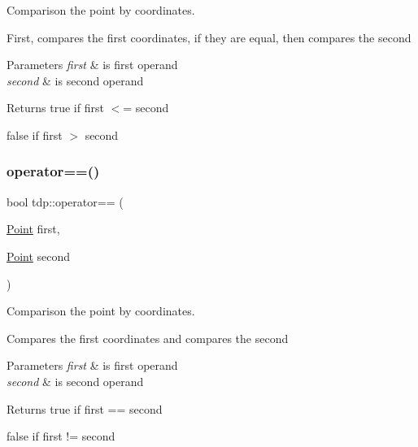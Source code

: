 Comparison the point by coordinates. 

First, compares the first coordinates, if they are equal, then compares the second 
\begin{DoxyParams}{Parameters}
{\em first} & is first operand \\
\hline
{\em second} & is second operand \\
\hline
\end{DoxyParams}
\begin{DoxyReturn}{Returns}
true if \textquotesingle{}first\textquotesingle{} $<$= \textquotesingle{}second\textquotesingle{} 

false if \textquotesingle{}first\textquotesingle{} $>$ \textquotesingle{}second\textquotesingle{} 
\end{DoxyReturn}
\mbox{\label{namespacetdp_ac28871640d9ee5c6f37f75be07b6d187}} 
\subsubsection{\texorpdfstring{operator==()}{operator==()}}
{\footnotesize\ttfamily bool tdp\+::operator== (\begin{DoxyParamCaption}\item[{\mbox{\hyperlink{structtdp_1_1_point}{Point}}}]{first,  }\item[{\mbox{\hyperlink{structtdp_1_1_point}{Point}}}]{second }\end{DoxyParamCaption})}



Comparison the point by coordinates. 

Compares the first coordinates and compares the second 
\begin{DoxyParams}{Parameters}
{\em first} & is first operand \\
\hline
{\em second} & is second operand \\
\hline
\end{DoxyParams}
\begin{DoxyReturn}{Returns}
true if \textquotesingle{}first\textquotesingle{} == \textquotesingle{}second\textquotesingle{} 

false if \textquotesingle{}first\textquotesingle{} != \textquotesingle{}second\textquotesingle{} 
\end{DoxyReturn}
\mbox{\label{namespacetdp_a948b73cf0c6d99e08e145094d83d8e97}} 
